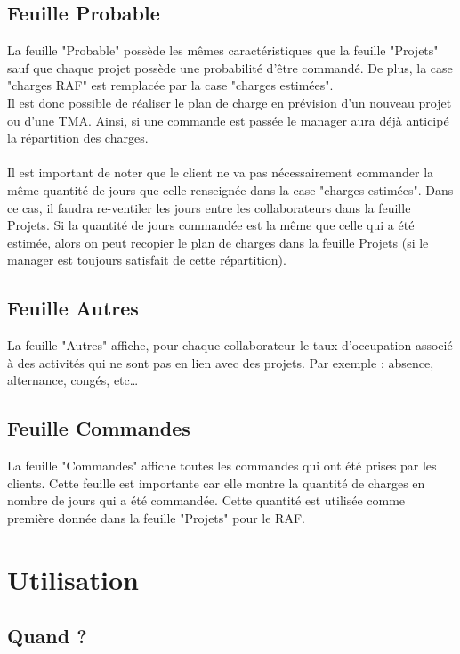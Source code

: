 \documentclass[french]{report}
\begin{document}
\subsection{Feuille Probable}

La feuille "Probable" possède les mêmes caractéristiques que la feuille
"Projets" sauf que chaque  projet possède une probabilité d’être commandé. De
plus, la case "charges RAF" est remplacée par la case "charges estimées".\\ Il
est donc possible de réaliser le plan de charge en  prévision d’un nouveau
projet ou d’une TMA.  Ainsi, si une commande est passée le manager aura déjà
anticipé la répartition des charges.\\\\ Il est important de noter que le client
ne va pas nécessairement commander la même quantité de jours que celle
renseignée dans la case "charges estimées". Dans ce cas, il faudra re-ventiler
les jours entre les collaborateurs dans la feuille Projets. Si la quantité de
jours commandée est la même que celle qui a été estimée, alors on peut recopier
le plan de charges dans la feuille Projets (si le manager est toujours
satisfait de cette répartition).

\subsection{Feuille Autres}

La feuille "Autres" affiche, pour chaque collaborateur le taux d'occupation
associé à des activités qui ne sont pas en lien avec des projets. Par exemple :
absence, alternance, congés, etc…

\subsection{Feuille Commandes}

La feuille "Commandes" affiche toutes les commandes qui ont été prises par les
clients. Cette feuille est importante car elle montre la quantité de charges en
nombre de jours qui a été commandée. Cette quantité est utilisée comme première
donnée dans la feuille "Projets" pour le RAF.

  \section{Utilisation}

\subsection{Quand ?}
\end{document}
